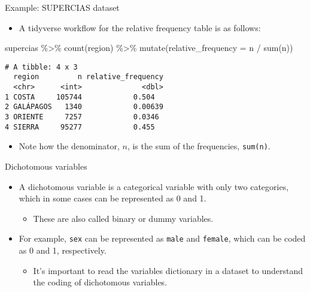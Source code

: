 \documentclass[
  10pt,
  ignorenonframetext,
]{beamer}
\newenvironment{Shaded}{\begin{snugshade}}{\end{snugshade}}
\newcommand{\AttributeTok}[1]{\textcolor[rgb]{0.40,0.45,0.13}{#1}}
\newcommand{\FunctionTok}[1]{\textcolor[rgb]{0.28,0.35,0.67}{#1}}
\newcommand{\NormalTok}[1]{\textcolor[rgb]{0.00,0.23,0.31}{#1}}
\newcommand{\SpecialCharTok}[1]{\textcolor[rgb]{0.37,0.37,0.37}{#1}}
\providecommand{\tightlist}{%
  \setlength{\itemsep}{0pt}\setlength{\parskip}{0pt}}\usepackage{longtable,booktabs,array}
\begin{document}
\begin{frame}[fragile]{Example: SUPERCIAS dataset}
\label{example-supercias-dataset-3}
\begin{itemize}
\tightlist
\item
  A tidyverse workflow for the relative frequency table is as follows:
\end{itemize}

\begin{Shaded}
\begin{Highlighting}[]
\NormalTok{supercias }\SpecialCharTok{\%\textgreater{}\%}
    \FunctionTok{count}\NormalTok{(region) }\SpecialCharTok{\%\textgreater{}\%}
    \FunctionTok{mutate}\NormalTok{(}\AttributeTok{relative\_frequency =}\NormalTok{ n }\SpecialCharTok{/} \FunctionTok{sum}\NormalTok{(n))}
\end{Highlighting}
\end{Shaded}

\begin{verbatim}
# A tibble: 4 x 3
  region         n relative_frequency
  <chr>      <int>              <dbl>
1 COSTA     105744            0.504  
2 GALÁPAGOS   1340            0.00639
3 ORIENTE     7257            0.0346 
4 SIERRA     95277            0.455  
\end{verbatim}

\begin{itemize}
\tightlist
\item
  Note how the denominator, \(n\), is the sum of the frequencies,
  \texttt{sum(n)}.
\end{itemize}
\end{frame}

\begin{frame}[fragile]{Dichotomous variables}
\label{dichotomous-variables}
\begin{itemize}
\tightlist
\item
  A dichotomous variable is a categorical variable with only two
  categories, which in some cases can be represented as 0 and 1.

  \begin{itemize}
  \tightlist
  \item
    These are also called binary or dummy variables.
  \end{itemize}
\item
  For example, \texttt{sex} can be represented as \texttt{male} and
  \texttt{female}, which can be coded as 0 and 1, respectively.

  \begin{itemize}
  \tightlist
  \item
    It's important to read the variables dictionary in a dataset to
    understand the coding of dichotomous variables.
  \end{itemize}
\end{itemize}
\end{frame}
\end{document}
